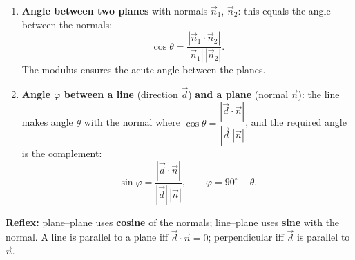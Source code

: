 \documentclass[11pt]{article}
\begin{document}
\begin{methode}
\begin{enumerate}
\item \textbf{Angle between two planes} with normals $\vec{n}_1$, $\vec{n}_2$: this equals the angle between the normals:
\[ \cos\theta = \frac{|\vec{n}_1 \cdot \vec{n}_2|}{|\vec{n}_1|\,|\vec{n}_2|}. \]
The modulus ensures the acute angle between the planes.
\item \textbf{Angle $\varphi$ between a line} (direction $\vec{d}$) \textbf{and a plane} (normal $\vec{n}$): the line makes angle $\theta$ with the normal where $\cos\theta = \dfrac{|\vec{d}\cdot\vec{n}|}{|\vec{d}||\vec{n}|}$, and the required angle is the complement:
\[ \sin\varphi = \frac{|\vec{d} \cdot \vec{n}|}{|\vec{d}|\,|\vec{n}|}, \qquad \varphi = 90^{\circ} - \theta. \]
\end{enumerate}
\textbf{Reflex:} plane--plane uses \textbf{cosine} of the normals; line--plane uses \textbf{sine} with the normal. A line is parallel to a plane iff $\vec{d}\cdot\vec{n} = 0$; perpendicular iff $\vec{d}$ is parallel to $\vec{n}$.
\end{methode}
\end{document}
